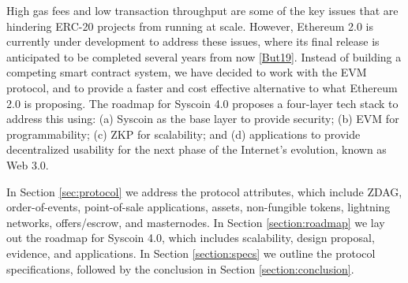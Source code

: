 \documentclass[peerreview]{ieeesyscoin}
\begin{document}
High gas fees and low transaction throughput are some of the key issues that are hindering ERC-20 projects from running at scale. However, Ethereum 2.0 is currently under development to address these issues, where its final release is anticipated to be completed several years from now \ref{But19}. Instead of building a competing smart contract system, we have decided to work with the EVM protocol, and to provide a faster and cost effective alternative to what Ethereum 2.0 is proposing. The roadmap for Syscoin 4.0 proposes a four-layer tech stack to address this using: (a) Syscoin as the base layer to provide security; (b) EVM for programmability; (c) ZKP for scalability; and (d) applications to provide decentralized usability for the next phase of the Internet's evolution, known as Web 3.0. 

In Section \ref{sec:protocol} we address the protocol attributes, which include ZDAG, order-of-events, point-of-sale applications, assets, non-fungible tokens, lightning networks, offers/escrow, and masternodes. In Section \ref{section:roadmap} we lay out the roadmap for Syscoin 4.0, which includes scalability, design proposal, evidence, and applications. In Section \ref{section:specs} we outline the protocol specifications, followed by the conclusion in Section \ref{section:conclusion}.
\end{document}
